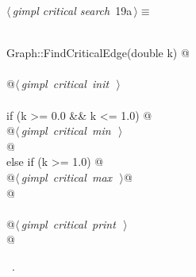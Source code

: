 \documentclass[12pt]{article}
\begin{document}
\begin{flushleft} \small
\begin{minipage}{\linewidth}\label{scrap31}\raggedright\small
{} $\langle\,${\itshape gimpl critical search}\nobreak\ {\footnotesize {19a}}$\,\rangle\equiv$
\vspace{-1ex}
\begin{list}{}{} \item
\mbox{}\verb@@\\
\mbox{}\verb@void Graph::FindCriticalEdge(double k) {@\\
\mbox{}\verb@@\\
\mbox{}\verb@    @\hbox{$\langle\,${\itshape gimpl critical init}\nobreak\ {\footnotesize {}}$\,\rangle$}\verb@@\\
\mbox{}\verb@@\\
\mbox{}\verb@    if (k >= 0.0 && k <= 1.0) {@\\
\mbox{}\verb@      @\hbox{$\langle\,${\itshape gimpl critical min}\nobreak\ {\footnotesize {}}$\,\rangle$}\verb@@\\
\mbox{}\verb@    }@\\
\mbox{}\verb@    else if (k >= 1.0) {@\\
\mbox{}\verb@      @\hbox{$\langle\,${\itshape gimpl critical max}\nobreak\ {\footnotesize {}}$\,\rangle$}\verb@  @\\
\mbox{}\verb@    }@\\
\mbox{}\verb@@\\
\mbox{}\verb@    @\hbox{$\langle\,${\itshape gimpl critical print}\nobreak\ {\footnotesize {}}$\,\rangle$}\verb@@\\
\mbox{}\verb@}@\\
\mbox{}\verb@@{\NWsep}
\end{list}
\vspace{-1.5ex}
\footnotesize
\begin{list}{}{\setlength{\itemsep}{-\parsep}\setlength{\itemindent}{-\leftmargin}}
\item \NWtxtMacroRefIn\ .

\item{}
\end{list}
\end{minipage}\vspace{4ex}
\end{flushleft}
\end{document}
